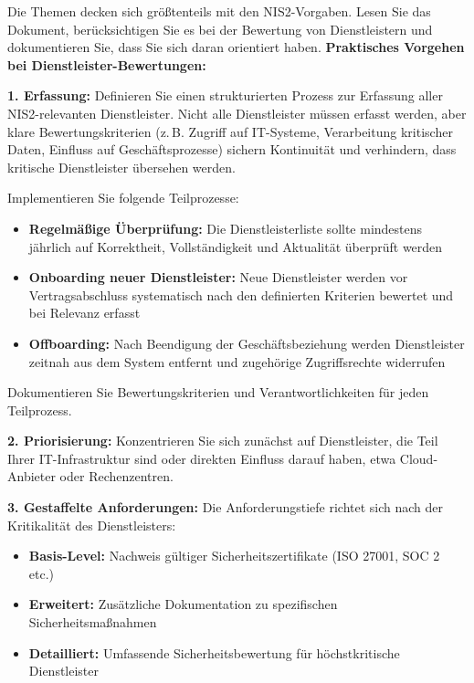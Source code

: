 Die Themen decken sich größtenteils mit den NIS2-Vorgaben. Lesen Sie das Dokument, berücksichtigen Sie es bei der Bewertung von Dienstleistern und dokumentieren Sie, dass Sie sich daran orientiert haben.
\newpage
\textbf{Praktisches Vorgehen bei Dienstleister-Bewertungen:}

\textbf{1. Erfassung:} Definieren Sie einen strukturierten Prozess zur Erfassung aller NIS2-relevanten Dienstleister. Nicht alle Dienstleister müssen erfasst werden, aber klare Bewertungskriterien (z.\,B. Zugriff auf IT-Systeme, Verarbeitung kritischer Daten, Einfluss auf Geschäftsprozesse) sichern Kontinuität und verhindern, dass kritische Dienstleister übersehen werden.

Implementieren Sie folgende Teilprozesse:
\begin{itemize}
    \item \textbf{Regelmäßige Überprüfung:} Die Dienstleisterliste sollte mindestens jährlich auf Korrektheit, Vollständigkeit und Aktualität überprüft werden
    \item \textbf{Onboarding neuer Dienstleister:} Neue Dienstleister werden vor Vertragsabschluss systematisch nach den definierten Kriterien bewertet und bei Relevanz erfasst
    \item \textbf{Offboarding:} Nach Beendigung der Geschäftsbeziehung werden Dienstleister zeitnah aus dem System entfernt und zugehörige Zugriffsrechte widerrufen
\end{itemize}

Dokumentieren Sie Bewertungskriterien und Verantwortlichkeiten für jeden Teilprozess.

\textbf{2. Priorisierung:} Konzentrieren Sie sich zunächst auf Dienstleister, die Teil Ihrer IT-Infrastruktur sind oder direkten Einfluss darauf haben, etwa Cloud-Anbieter oder Rechenzentren.

\textbf{3. Gestaffelte Anforderungen:} Die Anforderungstiefe richtet sich nach der Kritikalität des Dienstleisters:
\begin{itemize}
    \item \textbf{Basis-Level:} Nachweis gültiger Sicherheitszertifikate (ISO 27001, SOC 2 etc.)
    \item \textbf{Erweitert:} Zusätzliche Dokumentation zu spezifischen Sicherheitsmaßnahmen
    \item \textbf{Detailliert:} Umfassende Sicherheitsbewertung für höchstkritische Dienstleister
\end{itemize}

